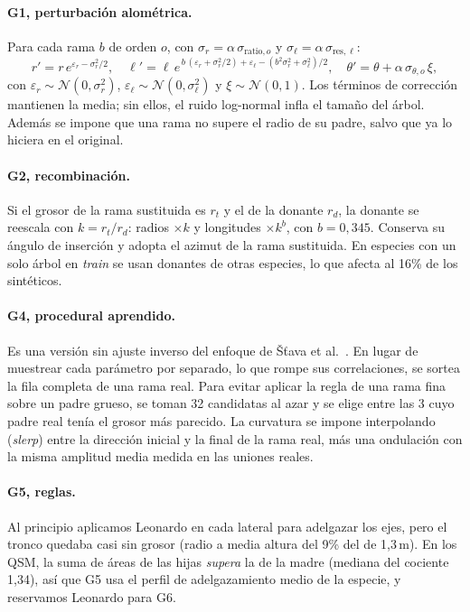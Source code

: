 \documentclass[11pt,a4paper]{article}
\begin{document}
\paragraph{G1, perturbación alométrica.} Para cada rama $b$ de orden $o$, con $\sigma_r = \alpha\,\sigma_{\text{ratio},o}$ y $\sigma_\ell = \alpha\,\sigma_{\text{res},\ell}$:
\begin{equation}
r' = r\, e^{\varepsilon_r - \sigma_r^2/2}, \quad
\ell' = \ell\, e^{\,b\,(\varepsilon_r + \sigma_r^2/2) + \varepsilon_\ell - (b^2\sigma_r^2 + \sigma_\ell^2)/2}, \quad
\theta' = \theta + \alpha\,\sigma_{\theta,o}\,\xi ,
\end{equation}
con $\varepsilon_r \sim \mathcal{N}(0,\sigma_r^2)$, $\varepsilon_\ell \sim \mathcal{N}(0,\sigma_\ell^2)$ y $\xi \sim \mathcal{N}(0,1)$. Los términos de corrección mantienen la media; sin ellos, el ruido log-normal infla el tamaño del árbol. Además se impone que una rama no supere el radio de su padre, salvo que ya lo hiciera en el original.

\paragraph{G2, recombinación.} Si el grosor de la rama sustituida es $r_t$ y el de la donante $r_d$, la donante se reescala con $k = r_t/r_d$: radios $\times k$ y longitudes $\times k^{b}$, con $b=0{,}345$. Conserva su ángulo de inserción y adopta el azimut de la rama sustituida. En especies con un solo árbol en \emph{train} se usan donantes de otras especies, lo que afecta al 16\% de los sintéticos.

\paragraph{G4, procedural aprendido.} Es una versión sin ajuste inverso del enfoque de Šťava et al.~\cite{stava2014inverse}. En lugar de muestrear cada parámetro por separado, lo que rompe sus correlaciones, se sortea la fila completa de una rama real. Para evitar aplicar la regla de una rama fina sobre un padre grueso, se toman 32 candidatas al azar y se elige entre las 3 cuyo padre real tenía el grosor más parecido. La curvatura se impone interpolando (\emph{slerp}) entre la dirección inicial y la final de la rama real, más una ondulación con la misma amplitud media medida en las uniones reales.

\paragraph{G5, reglas.} Al principio aplicamos Leonardo en cada lateral para adelgazar los ejes, pero el tronco quedaba casi sin grosor (radio a media altura del 9\% del de 1,3\,m). En los QSM, la suma de áreas de las hijas \emph{supera} la de la madre (mediana del cociente 1,34), así que G5 usa el perfil de adelgazamiento medio de la especie, y reservamos Leonardo para G6.
\end{document}

